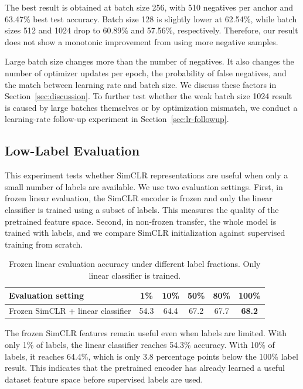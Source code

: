 \documentclass[10pt]{article}
\begin{document}
The best result is obtained at batch size 256, with 510 negatives per anchor and 63.47\% best test accuracy. Batch size 128 is slightly lower at 62.54\%, while batch sizes 512 and 1024 drop to 60.89\% and 57.56\%, respectively. Therefore, our result does not show a monotonic improvement from using more negative samples.

Large batch size changes more than the number of negatives. It also changes the number of optimizer updates per epoch, the probability of false negatives, and the match between learning rate and batch size. We discuss these factors in Section~\ref{sec:discussion}. To further test whether the weak batch size 1024 result is caused by large batches themselves or by optimization mismatch, we conduct a learning-rate follow-up experiment in Section~\ref{sec:lr-followup}.

\subsection{Low-Label Evaluation}

This experiment tests whether SimCLR representations are useful when only a small number of labels are available. We use two evaluation settings. First, in frozen linear evaluation, the SimCLR encoder is frozen and only the linear classifier is trained using a subset of labels. This measures the quality of the pretrained feature space. Second, in non-frozen transfer, the whole model is trained with labels, and we compare SimCLR initialization against supervised training from scratch.

\begin{table}[H]
\centering
\small
\begin{tabular}{lccccc}
\toprule
\textbf{Evaluation setting} & \textbf{1\%} & \textbf{10\%} & \textbf{50\%} & \textbf{80\%} & \textbf{100\%} \\
\midrule
Frozen SimCLR + linear classifier & 54.3 & 64.4 & 67.2 & 67.7 & \textbf{68.2} \\
\bottomrule
\end{tabular}
\caption{Frozen linear evaluation accuracy under different label fractions. Only linear classifier is trained.}
\label{tab:low-label-frozen}
\end{table}

The frozen SimCLR features remain useful even when labels are limited. With only 1\% of labels, the linear classifier reaches 54.3\% accuracy. With 10\% of labels, it reaches 64.4\%, which is only 3.8 percentage points below the 100\% label result. This indicates that the pretrained encoder has already learned a useful dataset feature space before supervised labels are used.
\end{document}
